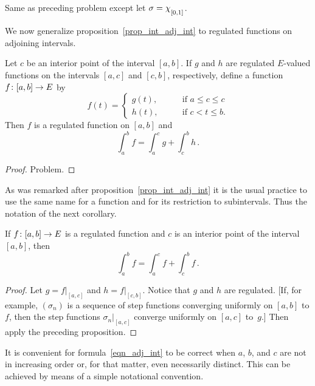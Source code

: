 \begin{prob} Same as preceding problem except let $\sigma = \chi_{{}_{\scriptstyle{[0,1]}}}$.
\end{prob}

We now generalize proposition~\ref{prop_int_adj_int} to regulated functions on adjoining
intervals.

\begin{prop} Let $c$ be an interior point of the interval $[a,b]$.  If $g$ and $h$ are regulated
$E$-valued functions on the intervals $[a,c]$ and $[c,b]$, respectively, define a function
$f\colon [a,b] \rightarrow E$ by
  \[ f(t) =
       \begin{cases}
              g(t), \qquad &\text{if $a \le c \le c$} \\
              h(t), \qquad &\text{if $c < t \le b.$}
       \end{cases} \]
Then $f$ is a regulated function on $[a,b]$ and
  \[ \int_a^b f = \int_a^c g + \int_c^b h\,. \]
\end{prop}

\begin{proof} Problem.  \ns  \end{proof}

As was remarked after proposition~\ref{prop_int_adj_int} it is the usual practice to use the
same name for a function and for its restriction to subintervals. Thus the notation of the
next corollary.

\begin{cor}\label{cor_int_adj_int} If $f\colon [a,b] \rightarrow E$ is a regulated function and $c$
is an interior point of the interval $[a,b]$, then
 \begin{equation}\label{eqn_adj_int}
    \int_a^b f = \int_a^c f + \int_c^b f\,.
 \end{equation}
\end{cor}

\begin{proof} Let $g = f|_{[a,c]}$ and $h = f|_{[c,b]}$.  Notice that $g$ and $h$ are regulated.
[If, for example, $(\sigma_n)$ is a  sequence of step functions converging uniformly on
$[a,b]$ to $f$, then the step functions $\sigma_n|_{[a,c]}$ converge uniformly on $[a,c]$
to~$g$.]  Then apply the preceding proposition.
\end{proof}

It is convenient for formula~\eqref{eqn_adj_int} to be correct when $a$, $b$, and $c$ are not
in increasing order or, for that matter, even necessarily distinct.  This can be achieved by
means of a simple notational convention.

